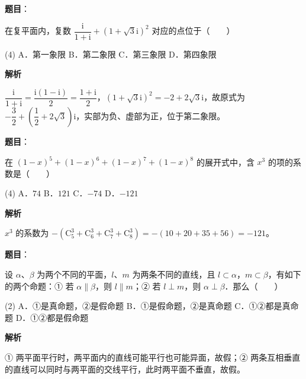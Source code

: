 \begin{answer}

\textbf{题目}：

在复平面内，复数 $\dfrac{\mathrm{i}}{1 + \mathrm{i}} + (1 + \sqrt{3}\mathrm{i})^2$ 对应的点位于\mbox{（　　）}

\begin{gkopts}(4)
\task A．第一象限
\task B．第二象限
\task C．第三象限
\task D．第四象限
\end{gkopts}

\textbf{解析}

$\dfrac{\mathrm{i}}{1 + \mathrm{i}} = \dfrac{\mathrm{i}(1 - \mathrm{i})}{2} = \dfrac{1 + \mathrm{i}}{2}$，$(1 + \sqrt{3}\mathrm{i})^2 = -2 + 2\sqrt{3}\mathrm{i}$，故原式为 $-\dfrac{3}{2} + \left(\dfrac{1}{2} + 2\sqrt{3}\right)\mathrm{i}$，实部为负、虚部为正，位于第二象限。


\end{answer}
\begin{answer}

\textbf{题目}：

在 $(1 - x)^5 + (1 - x)^6 + (1 - x)^7 + (1 - x)^8$ 的展开式中，含 $x^3$ 的项的系数是\mbox{（　　）}

\begin{gkopts}(4)
\task A．$74$
\task B．$121$
\task C．$-74$
\task D．$-121$
\end{gkopts}

\textbf{解析}

$x^3$ 的系数为 $-\left(\mathrm{C}_5^3 + \mathrm{C}_6^3 + \mathrm{C}_7^3 + \mathrm{C}_8^3\right) = -(10 + 20 + 35 + 56) = -121$。


\end{answer}
\begin{answer}

\textbf{题目}：

设 $\alpha$、$\beta$ 为两个不同的平面，$l$、$m$ 为两条不同的直线，且 $l \subset \alpha$，$m \subset \beta$，有如下的两个命题：① 若 $\alpha \parallel \beta$，则 $l \parallel m$；② 若 $l \perp m$，则 $\alpha \perp \beta$．那么\mbox{（　　）}

\begin{gkopts}(2)
\task A．①是真命题，②是假命题
\task B．①是假命题，②是真命题
\task C．①②都是真命题
\task D．①②都是假命题
\end{gkopts}

\textbf{解析}

① 两平面平行时，两平面内的直线可能平行也可能异面，故假；② 两条互相垂直的直线可以同时与两平面的交线平行，此时两平面不垂直，故假。


\end{answer}
